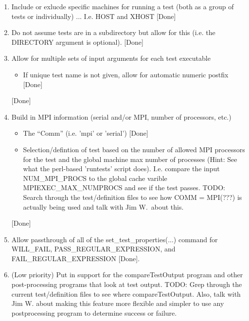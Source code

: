 \documentclass[pdf,ps2pdf,11pt]{SANDreport}
\begin{document}
\begin{enumerate}
\begin{enumerate}
  {}\item Include or exlucde specific machines for running a test
  (both as a group of tests or individually) ... I.e. HOST and XHOST
  [Done]

  {}\item Do not assume tests are in a subdirectory but allow for this
  (i.e. the DIRECTORY argument is optional). [Done]

  {}\item Allow for multiple sets of input arguments for each test
  executable

    \begin{itemize}

    {}\item If unique test name is not given, allow for automatic
    numeric postfix [Done]

    \end{itemize}

   [Done]

  {}\item Build in MPI information (serial and/or MPI, number of
  processors, etc.)

    \begin{itemize}

    {}\item The ``Comm'' (i.e. 'mpi' or 'serial') [Done]

    {}\item Selection/defintion of test based on the number of allowed
    MPI processors for the test and the global machine max number of
    processes (Hint: See what the perl-based 'runtests' script does).
    I.e. compare the input NUM\_MPI\_PROCS to the global cache varible
    MPIEXEC\_MAX\_NUMPROCS and see if the test passes.  TODO: Search
    through the test/definition files to see how COMM = MPI(???) is
    actually being used and talk with Jim W.\ about this.
	
    \end{itemize}

   [Done]

  {}\item Allow passthrough of all of the set\_test\_properties(...) 
  command for WILL\_FAIL, PASS\_REGULAR\_EXPRESSION, and
  FAIL\_REGULAR\_EXPRESSION [Done].

  {}\item (Low priority) Put in support for the compareTestOutput
  program and other post-processing programs that look at test output.
  TODO: Grep through the current test/definition files to see where
  compareTestOutput.  Also, talk with Jim W. about making this feature
  more flexible and simpler to use any postprocessing program to
  determine success or failure.


\end{enumerate}
\end{enumerate}
\end{document}
